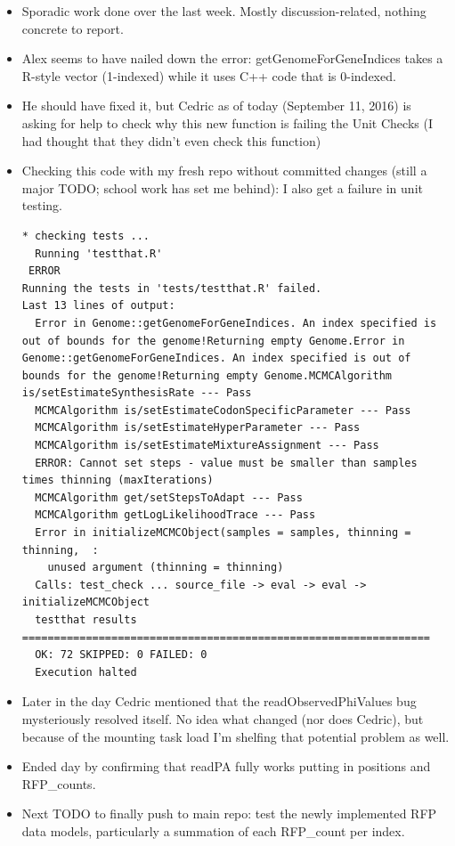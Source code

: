 \documentclass[12pt,hyperref]{labbook}
\newcommand{\sep}{\discretionary{}{}{}} %
\begin{document}
\begin{itemize}
    \item Sporadic work done over the last week.
    Mostly discussion-related, nothing concrete to report.
    \item Alex seems to have nailed down the error: getGenomeForGeneIndices takes a R-style vector (1-indexed) while it uses C++ code that is 0-indexed.
    \item He should have fixed it, but Cedric as of today (September 11, 2016) is asking for help to check why this new function is failing the Unit Checks (I had thought that they didn't even check this function)
    \item Checking this code with my fresh repo without committed changes (still a major TODO; school work has set me behind): I also get a failure in unit testing.
    \begin{lstlisting}
* checking tests ...
  Running 'testthat.R'
 ERROR
Running the tests in 'tests/testthat.R' failed.
Last 13 lines of output:
  Error in Genome::getGenomeForGeneIndices. An index specified is out of bounds for the genome!Returning empty Genome.Error in Genome::getGenomeForGeneIndices. An index specified is out of bounds for the genome!Returning empty Genome.MCMCAlgorithm is/setEstimateSynthesisRate --- Pass
  MCMCAlgorithm is/setEstimateCodonSpecificParameter --- Pass
  MCMCAlgorithm is/setEstimateHyperParameter --- Pass
  MCMCAlgorithm is/setEstimateMixtureAssignment --- Pass
  ERROR: Cannot set steps - value must be smaller than samples times thinning (maxIterations)
  MCMCAlgorithm get/setStepsToAdapt --- Pass
  MCMCAlgorithm getLogLikelihoodTrace --- Pass
  Error in initializeMCMCObject(samples = samples, thinning = thinning,  : 
    unused argument (thinning = thinning)
  Calls: test_check ... source_file -> eval -> eval -> initializeMCMCObject
  testthat results ================================================================
  OK: 72 SKIPPED: 0 FAILED: 0
  Execution halted
    \end{lstlisting}
    \item Later in the day Cedric mentioned that the readObservedPhiValues bug mysteriously resolved itself.
    No idea what changed (nor does Cedric), but because of the mounting task load I'm shelfing that potential problem as well.
    \item Ended day by confirming that read\sep PA fully works putting in positions and RFP\sep \_\sep counts.
    \item Next TODO to finally push to main repo: test the newly implemented RFP data models, particularly a summation of each RFP\_count per index.
\end{itemize}
\end{document}
